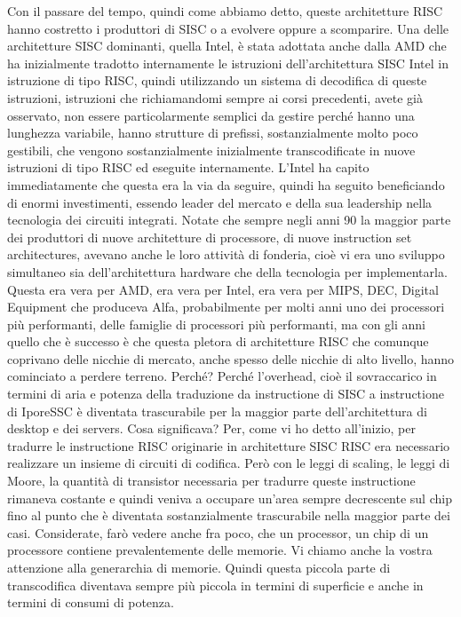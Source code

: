 Con il passare del tempo, quindi come abbiamo detto, queste architetture RISC hanno costretto i produttori di SISC o a evolvere oppure a scomparire.
Una delle architetture SISC dominanti, quella Intel, è stata adottata anche dalla AMD che ha inizialmente tradotto internamente le istruzioni dell'architettura SISC Intel in istruzione di tipo RISC, quindi utilizzando un sistema di decodifica di queste istruzioni, istruzioni che richiamandomi sempre ai corsi precedenti, avete già osservato, non essere particolarmente semplici da gestire perché hanno una lunghezza variabile, hanno strutture di prefissi, sostanzialmente molto poco gestibili, che vengono sostanzialmente inizialmente transcodificate in nuove istruzioni di tipo RISC ed eseguite internamente.
L'Intel ha capito immediatamente che questa era la via da seguire, quindi ha seguito beneficiando di enormi investimenti, essendo leader del mercato e della sua leadership nella tecnologia dei circuiti integrati.
Notate che sempre negli anni 90 la maggior parte dei produttori di nuove architetture di processore, di nuove instruction set architectures, avevano anche le loro attività di fonderia, cioè vi era uno sviluppo simultaneo sia dell'architettura hardware che della tecnologia per implementarla.
Questa era vera per AMD, era vera per Intel, era vera per MIPS, DEC, Digital Equipment che produceva Alfa, probabilmente per molti anni uno dei processori più performanti, delle famiglie di processori più performanti, ma con gli anni quello che è successo è che questa pletora di architetture RISC che comunque coprivano delle nicchie di mercato, anche spesso delle nicchie di alto livello, hanno cominciato a perdere terreno.
Perché?
Perché l'overhead, cioè il sovraccarico in termini di aria e potenza della traduzione da instructione di SISC a instructione di IporeSSC è diventata trascurabile per la maggior parte dell'architettura di desktop e dei servers.
Cosa significava?
Per, come vi ho detto all'inizio, per tradurre le instructione RISC originarie in architetture SISC RISC era necessario realizzare un insieme di circuiti di codifica.
Però con le leggi di scaling, le leggi di Moore, la quantità di transistor necessaria per tradurre queste instructione rimaneva costante e quindi veniva a occupare un'area sempre decrescente sul chip fino al punto che è diventata sostanzialmente trascurabile nella maggior parte dei casi.
Considerate, farò vedere anche fra poco, che un processor, un chip di un processore contiene prevalentemente delle memorie.
Vi chiamo anche la vostra attenzione alla generarchia di memorie.
Quindi questa piccola parte di transcodifica diventava sempre più piccola in termini di superficie e anche in termini di consumi di potenza.
